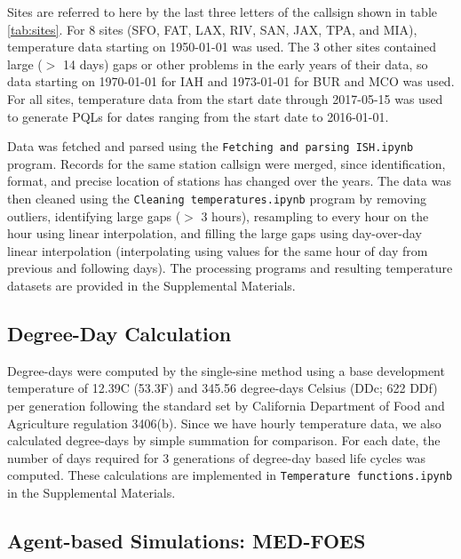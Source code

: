 \documentclass[10pt,a4paper,twocolumn]{article}
\begin{document}
Sites are referred to here by the last three letters of the callsign shown in table \ref{tab:sites}.
For 8 sites (SFO, FAT, LAX, RIV, SAN, JAX, TPA, and MIA), temperature data starting on 1950-01-01 was used.
The 3 other sites contained large ($>$ 14 days) gaps or other problems in the early years of their data,
so data starting on 1970-01-01 for IAH and 1973-01-01 for BUR and MCO was used.
For all sites, temperature data from the start date through 2017-05-15 was used
to generate PQLs for dates ranging from the start date to 2016-01-01.

Data was fetched and parsed using the \texttt{Fetching and parsing ISH.ipynb} program.
Records for the same station callsign were merged, since identification, format, 
and precise location of stations has changed over the years.
The data was then cleaned using the 
\texttt{Cleaning temperatures.ipynb} program by 
removing outliers, 
identifying large gaps ($>$ 3 hours), 
resampling to every hour on the hour using linear interpolation,
and filling the large gaps using day-over-day linear interpolation
(interpolating using values for the same hour of day from previous and following days).
The processing programs and resulting temperature datasets are 
provided in the Supplemental Materials.


\subsection*{Degree-Day Calculation}
Degree-days were computed by the single-sine method\cite{ECY:ECY1969503514}
using a base development temperature of 12.39\degree C (53.3\degree F) 
and 345.56 degree-days Celsius (DDc; 622 DDf) per generation 
following the standard set by California Department of Food and Agriculture
regulation 3406(b)\cite{CDFA_Medfly,3-CA-ADC-3406}.
Since we have hourly temperature data, we also calculated degree-days by simple summation
for comparison\cite{Roltsch1999}.
For each date, the number of days required for 3 generations of degree-day 
based life cycles was computed.
These calculations are implemented in \texttt{Temperature functions.ipynb} in the Supplemental Materials.


\subsection*{Agent-based Simulations: MED-FOES}
\end{document}
